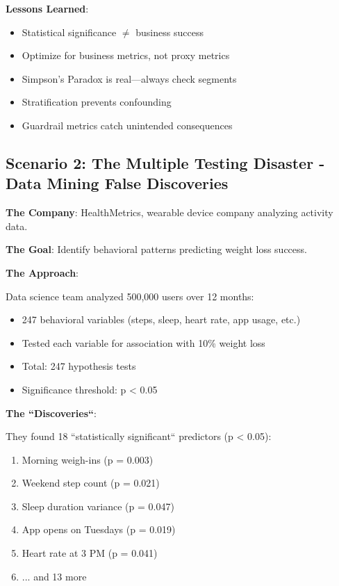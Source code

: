 \textbf{Lessons Learned}:
\begin{itemize}
    \item Statistical significance $\neq$ business success
    \item Optimize for business metrics, not proxy metrics
    \item Simpson's Paradox is real---always check segments
    \item Stratification prevents confounding
    \item Guardrail metrics catch unintended consequences
\end{itemize}

\subsection{Scenario 2: The Multiple Testing Disaster - Data Mining False Discoveries}

\textbf{The Company}: HealthMetrics, wearable device company analyzing activity data.

\textbf{The Goal}: Identify behavioral patterns predicting weight loss success.

\textbf{The Approach}:

Data science team analyzed 500,000 users over 12 months:
\begin{itemize}
    \item 247 behavioral variables (steps, sleep, heart rate, app usage, etc.)
    \item Tested each variable for association with 10\% weight loss
    \item Total: 247 hypothesis tests
    \item Significance threshold: p < 0.05
\end{itemize}

\textbf{The ``Discoveries``}:

They found 18 ``statistically significant`` predictors (p < 0.05):
\begin{enumerate}
    \item Morning weigh-ins (p = 0.003)
    \item Weekend step count (p = 0.021)
    \item Sleep duration variance (p = 0.047)
    \item App opens on Tuesdays (p = 0.019)
    \item Heart rate at 3 PM (p = 0.041)
    \item ... and 13 more
\end{enumerate}

